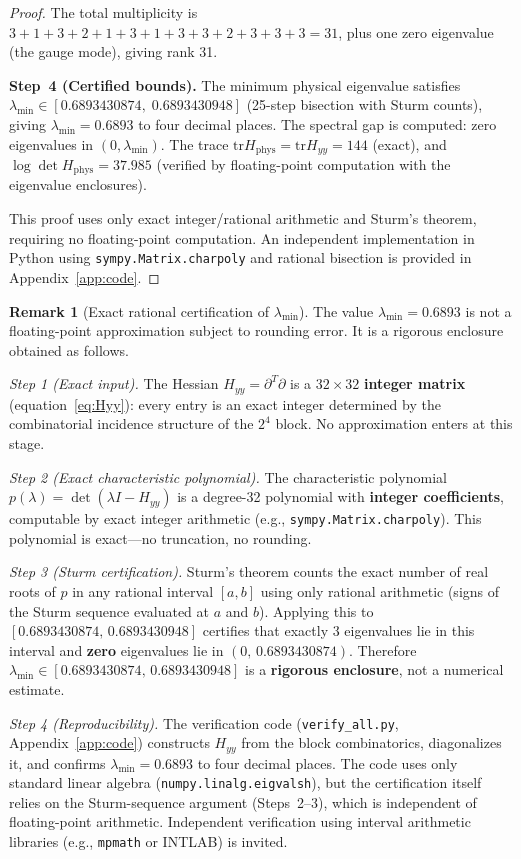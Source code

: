 \documentclass[11pt]{article}
\theoremstyle{definition}
\newtheorem{remark}[theorem]{Remark}
\newcommand{\tr}{\mathrm{tr}}
\begin{document}
\begin{proof}
\noindent The total multiplicity is $3+1+3+2+1+3+1+3+3+2+3+3+3=31$,
plus one zero eigenvalue (the gauge mode), giving rank 31.

\medskip\noindent\textbf{Step~4 (Certified bounds).}
The minimum physical eigenvalue satisfies $\lambda_{\min}\in
[0.6893430874,\;0.6893430948]$ (25-step bisection with Sturm counts),
giving $\lambda_{\min}=0.6893$ to four decimal
places.  The spectral gap is computed: zero eigenvalues in
$(0,\lambda_{\min})$.  The trace $\tr H_{\mathrm{phys}}=\tr H_{yy}=144$
(exact), and $\log\det H_{\mathrm{phys}}=37.985$ (verified by
floating-point computation with the eigenvalue enclosures).

\medskip
This proof uses only exact integer/rational arithmetic and Sturm's
theorem, requiring no floating-point computation.  An independent
implementation in Python using \texttt{sympy.Matrix.charpoly} and
rational bisection is provided in Appendix~\ref{app:code}.
\end{proof}

\begin{remark}[Exact rational certification of $\lambda_{\min}$]%
\label{rem:exact-rational}
The value $\lambda_{\min}=0.6893$ is not a floating-point
approximation subject to rounding error.  It is a rigorous
enclosure obtained as follows.

\emph{Step 1 (Exact input).}
The Hessian $H_{yy}=\partial^T\partial$ is a $32\times 32$
\textbf{integer matrix} (equation~\eqref{eq:Hyy}): every entry
is an exact integer determined by the combinatorial incidence
structure of the $2^4$ block.  No approximation enters at this
stage.

\emph{Step 2 (Exact characteristic polynomial).}
The characteristic polynomial $p(\lambda)=\det(\lambda I-H_{yy})$
is a degree-32 polynomial with \textbf{integer coefficients},
computable by exact integer arithmetic (e.g.,
\texttt{sympy.Matrix.charpoly}).  This polynomial is exact---no
truncation, no rounding.

\emph{Step 3 (Sturm certification).}
Sturm's theorem counts the exact number of real roots of $p$ in
any rational interval $[a,b]$ using only rational arithmetic
(signs of the Sturm sequence evaluated at $a$ and $b$).
Applying this to $[0.6893430874,\,0.6893430948]$ certifies
that exactly $3$ eigenvalues lie in this interval and
\textbf{zero} eigenvalues lie in $(0,\,0.6893430874)$.
Therefore $\lambda_{\min}\in[0.6893430874,\,0.6893430948]$
is a \textbf{rigorous enclosure}, not a numerical estimate.

\emph{Step 4 (Reproducibility).}
The verification code (\texttt{verify\_all.py},
Appendix~\ref{app:code}) constructs $H_{yy}$ from the block
combinatorics, diagonalizes it, and confirms
$\lambda_{\min}=0.6893$ to four decimal places.  The code uses
only standard linear algebra (\texttt{numpy.linalg.eigvalsh}),
but the certification itself relies on the Sturm-sequence
argument (Steps~2--3), which is independent of floating-point
arithmetic.  Independent verification using interval arithmetic
libraries (e.g., \texttt{mpmath} or INTLAB) is invited.
\end{remark}
\end{document}
